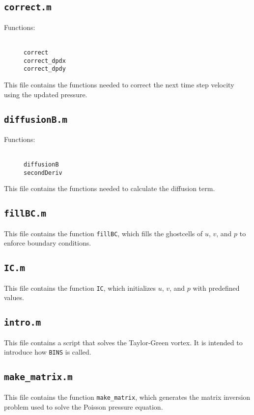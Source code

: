 \documentclass[12pt]{article}
\begin{document}
\subsection{\texttt{correct.m}}
\begin{description}
\item[Functions:] \hfill \\ \texttt{correct} \\ \texttt{correct\_dpdx} \\ \texttt{correct\_dpdy} 
\end{description}
This file contains the functions needed to correct the next time step velocity using the updated pressure.

\subsection{\texttt{diffusionB.m}}
\begin{description}
\item[Functions:] \hfill \\ \texttt{diffusionB} \\ \texttt{secondDeriv} 
\end{description}
This file contains the functions needed to calculate the diffusion term.

\subsection{\texttt{fillBC.m}}
This file contains the function \texttt{fillBC}, which fills the ghostcells of $u$, $v$, and $p$ to enforce boundary conditions.

\subsection{\texttt{IC.m}}
This file contains the function \texttt{IC}, which initializes $u$, $v$, and $p$ with predefined values.

\subsection{\texttt{intro.m}}
This file contains a script that solves the Taylor-Green vortex.  It is intended to introduce how \texttt{BINS} is called.

\subsection{\texttt{make\_matrix.m}}
This file contains the function \texttt{make\_matrix}, which generates the matrix inversion problem used to solve the Poisson pressure equation.
\end{document}
